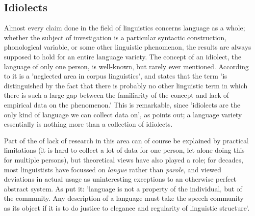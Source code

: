 \documentclass[12pt]{article}
\begin{document}

\subsection{Idiolects} \label{idiolects}
Almost every claim done in the field of linguistics concerns language as a whole; whether the subject of investigation is a particular syntactic construction, phonological variable, or some other linguistic phenomenon, the results are always supposed to hold for an entire language variety. The concept of an idiolect, the language of only one person, is well-known, but rarely ever mentioned. According to  it is a 'neglected area in corpus linguistics', and  states that the term 'is distinguished by the fact that there is probably no other linguistic term in which there is such a large gap between the familiarity of the concept and lack of empirical data on the phenomenon.' This is remarkable, since 'idiolects are the only kind of language we can 
collect data on', as  points out; a language variety essentially is nothing more than a collection of idiolects.

Part of the of lack of research in this area can of course be explained by practical limitations (it is hard to collect a lot of data for one person, let alone doing this for multiple persons), but theoretical views have also played a role; for decades, most linguistists have focussed on \emph{langue} rather than \emph{parole}, and viewed deviations in actual usage as uninteresting exceptions to an otherwise perfect abstract system. As  put it: 'language is not a property of the individual, but of the community. Any description of a language must take the speech community as its object if it is to do justice to elegance and regularity of linguistic structure'.
\end{document}

